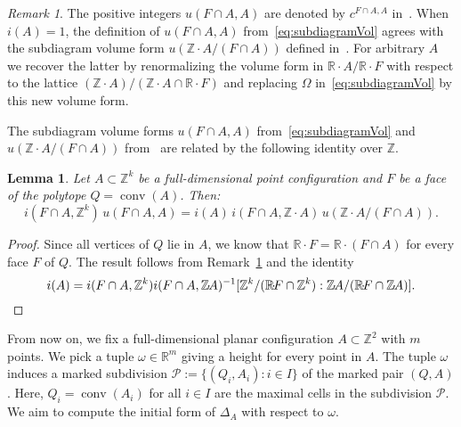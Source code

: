 \documentclass[11pt]{amsart}
\numberwithin{equation}{section}
\theoremstyle{plain}
\newtheorem{lemma}[theorem]{Lemma}
\theoremstyle{definition}
\theoremstyle{remark}
\newtheorem{remark}[theorem]{Remark}
\begin{document}
\begin{remark}\label{rem:GKZvsEsterov}
  The positive integers $u(F\cap A, A)$ are denoted by $c^{F\cap A,
    A}$ in~\cite[$\S 2.5$]{Est10}. When $i(A)=1$, the definition of
  $u(F\cap A, A)$ from~\eqref{eq:subdiagramVol} agrees with the
  subdiagram volume form $u({\mathbb{Z}}{\!\cdot\!} A/(F\cap A))$ defined
  in~\cite[Chapter 5, Theorem~2.8]{GKZ}. For arbitrary $A$ we recover
  the latter by renormalizing the volume form in ${\mathbb{R}}{\!\cdot\!}
  A/{\mathbb{R}}{\!\cdot\!} F$ with respect to the lattice $({\mathbb{Z}}{\!\cdot\!}
  A)/({\mathbb{Z}}{\!\cdot\!} A\cap {\mathbb{R}}{\!\cdot\!} F)$ and replacing $\Omega$
  in~\eqref{eq:subdiagramVol} by this new volume form.
\end{remark}

The subdiagram volume forms $u(F\cap A, A)$
from~\eqref{eq:subdiagramVol} and $u({\mathbb{Z}}{\!\cdot\!} A/(F\cap A))$
from~\cite[Chapter 5]{GKZ} are related by the following identity over ${\mathbb{Z}}$.
\begin{lemma}\label{lm:SubdiagramVolIdentities} Let $A\subset {\mathbb{Z}}^k$
  be a full-dimensional point configuration and $F$ be a face of the
  polytope $Q=\operatorname{\operatorname{conv}}(A)$. Then:
  \begin{equation*}
    \label{eq:VolIdentities}
    i(F\cap A, {\mathbb{Z}}^k)\, u(F\cap A, A) =i(A)\, i(F\cap A, {\mathbb{Z}}{\!\cdot\!} A) \, u({\mathbb{Z}}{\!\cdot\!} A/ (F\cap A)).
  \end{equation*}
\end{lemma}
\begin{proof} Since all vertices of $Q$ lie in $A$, we know that
  ${\mathbb{R}}{\!\cdot\!} F= {\mathbb{R}}{\!\cdot\!} (F\cap A)$ for every face $F$ of
  $Q$.  The result follows from Remark~\ref{rem:GKZvsEsterov} and the
  identity \[ i(A)={i(F\cap A, {\mathbb{Z}}^k)} i(F\cap A, {\mathbb{Z}}{\!\cdot\!}
  A)^{-1} [{\mathbb{Z}}^k/({\mathbb{R}}{\!\cdot\!} F\cap {\mathbb{Z}}^k): {\mathbb{Z}}{\!\cdot\!}
  A/({\mathbb{R}}{\!\cdot\!} F\cap {\mathbb{Z}}{\!\cdot\!} A)].\qedhere\]
\end{proof}

From now on, we fix a full-dimensional planar configuration $A\subset
{\mathbb{Z}}^2$ with $m$ points.  We pick a tuple ${\omega}\in {\mathbb{R}}^m$ giving a
height for every point in $A$. The tuple ${\omega}$ induces a marked
subdivision ${\mathcal{P}}:=\{(Q_i, A_i): i\in I\}$ of the marked pair
$(Q,A)$. Here, $Q_i=\operatorname{\operatorname{conv}}(A_i)$ for all $i\in I$ are the maximal cells
in the subdivision ${\mathcal{P}}$.  We aim to compute the initial form of
$\Delta_A$ with respect to ${\omega}$.
\end{document}
